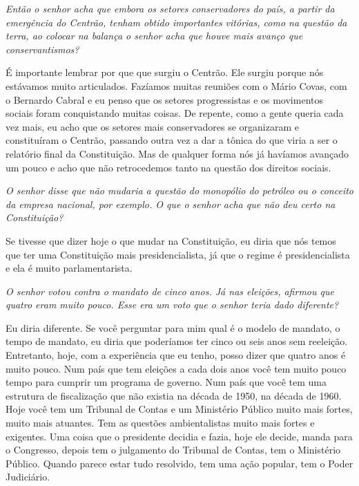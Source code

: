 \medskip

\noindent\emph{Então o senhor acha que embora os setores conservadores do país,
a partir da emergência do Centrão, tenham obtido importantes vitórias,
como na questão da terra, ao colocar na balança o senhor acha que houve
mais avanço que conservantismos?}

É importante lembrar por que que surgiu o Centrão. Ele
surgiu porque nós estávamos muito articulados. Fazíamos muitas reuniões
com o Mário Covas, com o Bernardo Cabral e eu penso que os setores
progressistas e os movimentos sociais foram conquistando muitas coisas.
De repente, como a gente queria cada vez mais, eu acho que os setores
mais conservadores se organizaram e constituíram o Centrão, passando
outra vez a dar a tônica do que viria a ser o relatório final da
Constituição. Mas de qualquer forma nós já havíamos avançado um pouco e
acho que não retrocedemos tanto na questão dos direitos sociais.

\medskip

\noindent\emph{O senhor disse que não mudaria a questão do monopólio do
petróleo ou o conceito da empresa nacional, por exemplo. O que o senhor
acha que não deu certo na Constituição?}

Se tivesse que dizer hoje o que mudar na Constituição, eu
diria que nós temos que ter uma Constituição mais presidencialista, já
que o regime é presidencialista e ela é muito parlamentarista.

\medskip

\noindent\emph{O senhor votou contra o mandato de cinco anos. Já nas eleições,
afirmou que quatro eram muito pouco. Esse era um voto que o senhor teria
dado diferente?}

Eu diria diferente. Se você perguntar para mim qual é o
modelo de mandato, o tempo de mandato, eu diria que poderíamos ter cinco
ou seis anos sem reeleição. Entretanto, hoje, com a experiência que eu
tenho, posso dizer que quatro anos é muito pouco. Num país que tem
eleições a cada dois anos você tem muito pouco tempo para cumprir um
programa de governo. Num país que você tem uma estrutura de fiscalização
que não existia na década de 1950, na década de 1960. Hoje você tem um
Tribunal de Contas e um Ministério Público muito mais fortes, muito mais
atuantes. Tem as questões ambientalistas muito mais fortes e exigentes.
Uma coisa que o presidente decidia e fazia, hoje ele decide, manda para
o Congresso, depois tem o julgamento do Tribunal de Contas, tem o
Ministério Público. Quando parece estar tudo resolvido, tem uma ação
popular, tem o Poder Judiciário.

